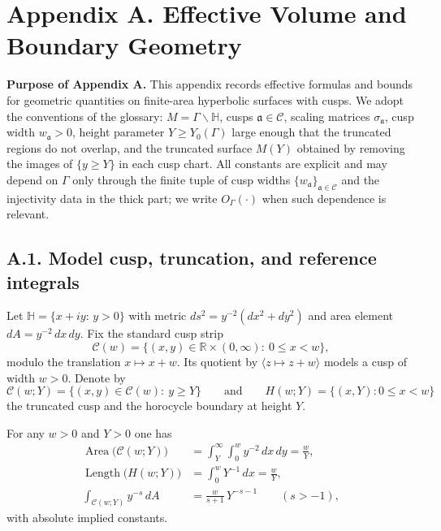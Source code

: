 \appendix
\section*{Appendix A. Effective Volume and Boundary Geometry}

\noindent\textbf{Purpose of Appendix A.}
This appendix records effective formulas and bounds for geometric quantities on
finite-area hyperbolic surfaces with cusps. We adopt the conventions of the
glossary: $M=\Gamma\backslash\mathbb H$, cusps $\mathfrak a\in\mathcal C$, scaling
matrices $\sigma_{\mathfrak a}$, cusp width $w_{\mathfrak a}>0$, height parameter
$Y\ge Y_0(\Gamma)$ large enough that the truncated regions do not overlap, and
the truncated surface $M(Y)$ obtained by removing the images of
$\{y\ge Y\}$ in each cusp chart. All constants are explicit and may depend on
$\Gamma$ only through the finite tuple of cusp widths
$\{w_{\mathfrak a}\}_{\mathfrak a\in\mathcal C}$ and the injectivity data in the
thick part; we write $O_\Gamma(\cdot)$ when such dependence is relevant.

\subsection*{A.1. Model cusp, truncation, and reference integrals}

\noindent
Let $\mathbb H=\{x+iy:\,y>0\}$ with metric $ds^2= y^{-2}(dx^2+dy^2)$ and area
element $dA=y^{-2}\,dx\,dy$. Fix the standard cusp strip
\[
\mathcal C(w)=\{(x,y)\in\mathbb R\times(0,\infty):\ 0\le x<w\},
\]
modulo the translation $x\mapsto x+w$. Its quotient by $\langle z\mapsto z+w\rangle$
models a cusp of width $w>0$. Denote by
\[
\mathcal C(w;Y)=\big\{(x,y)\in \mathcal C(w):\ y\ge Y\big\}
\qquad\text{and}\qquad
H(w;Y)=\{(x,Y):0\le x<w\}
\]
the truncated cusp and the horocycle boundary at height $Y$.

\begin{lemma}\label{lem:ref-int}
For any $w>0$ and $Y>0$ one has
\begin{align}
\operatorname{Area}\big(\mathcal C(w;Y)\big)
&=\int_Y^\infty\int_0^{w} y^{-2}\,dx\,dy
=\frac{w}{Y},\label{eq:area-cusp}\\
\operatorname{Length}\big(H(w;Y)\big)
&=\int_0^w Y^{-1}\,dx
=\frac{w}{Y},\label{eq:length-horo}\\
\int_{\mathcal C(w;Y)} y^{-s}\,dA
&=\frac{w}{s+1}\,Y^{-s-1}\qquad (s>-1),\label{eq:ys-int}
\end{align}
with absolute implied constants.
\end{lemma}

